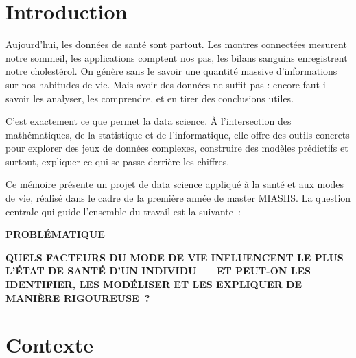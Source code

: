 
\chapter*{Introduction}

Aujourd'hui, les données de santé sont partout. Les montres connectées mesurent notre sommeil, les applications comptent nos pas, les bilans sanguins enregistrent notre cholestérol. On génère sans le savoir une quantité massive d'informations sur nos habitudes de vie. Mais avoir des données ne suffit pas : encore faut-il savoir les analyser, les comprendre, et en tirer des conclusions utiles.

C'est exactement ce que permet la data science. À l'intersection des mathématiques, de la statistique et de l'informatique, elle offre des outils concrets pour explorer des jeux de données complexes, construire des modèles prédictifs et surtout, expliquer ce qui se passe derrière les chiffres.

Ce mémoire présente un projet de data science appliqué à la santé et aux modes de vie, réalisé dans le cadre de la première année de master MIASHS. La question centrale qui guide l'ensemble du travail est la suivante~:

\vspace{0.8cm}
\begin{tcolorbox}[
  colback=cyan!12,
  colframe=cyan!60!black,
  boxrule=1.2pt,
  arc=5pt,
  left=1cm, right=1cm, top=0.6cm, bottom=0.6cm
]
  \begin{center}
    {\large\bfseries PROBLÉMATIQUE}
  \end{center}
  \vspace{0.4cm}
  \begin{center}
    {\bfseries QUELS FACTEURS DU MODE DE VIE INFLUENCENT LE PLUS L'ÉTAT DE SANTÉ D'UN INDIVIDU~--- ET PEUT-ON LES IDENTIFIER, LES MODÉLISER ET LES EXPLIQUER DE MANIÈRE RIGOUREUSE~?}
  \end{center}
\end{tcolorbox}
\vspace{0.8cm}

\chapter*{Contexte}

